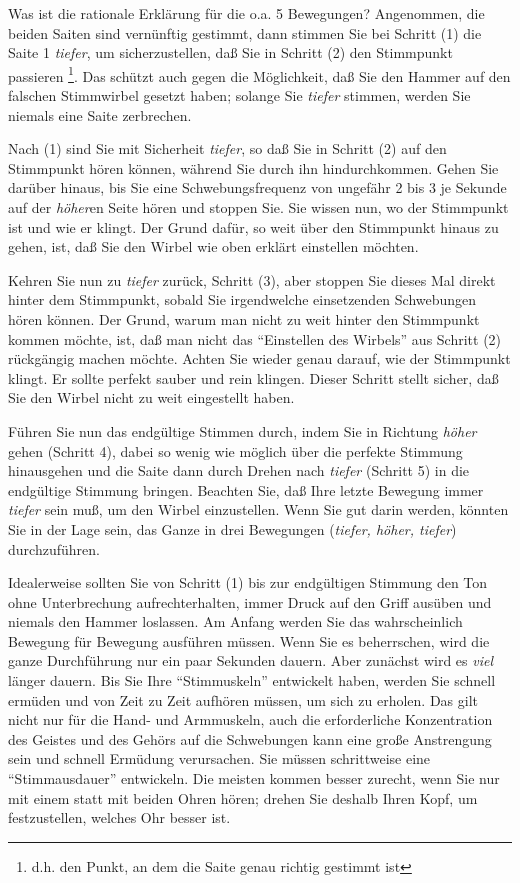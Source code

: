 Was ist die rationale Erklärung für die o.a. 5 Bewegungen?
 Angenommen, die beiden Saiten sind vernünftig gestimmt, dann stimmen Sie bei Schritt (1) die Saite 1 \textit{tiefer}, um sicherzustellen, daß Sie in Schritt (2) den Stimmpunkt passieren \footnote{d.h. den Punkt, an dem die Saite genau richtig gestimmt ist}.
 Das schützt auch gegen die Möglichkeit, daß Sie den Hammer auf den falschen Stimmwirbel gesetzt haben; solange Sie \textit{tiefer} stimmen, werden Sie niemals eine Saite zerbrechen.
 

Nach (1) sind Sie mit Sicherheit \textit{tiefer}, so daß Sie in Schritt (2) auf den Stimmpunkt hören können, während Sie durch ihn hindurchkommen.
 Gehen Sie darüber hinaus, bis Sie eine Schwebungsfrequenz von ungefähr 2 bis 3 je Sekunde auf der \textit{höher}en Seite hören und stoppen Sie.
 Sie wissen nun, wo der Stimmpunkt ist und wie er klingt.
 Der Grund dafür, so weit über den Stimmpunkt hinaus zu gehen, ist, daß Sie den Wirbel wie oben erklärt einstellen möchten.
 

Kehren Sie nun zu \textit{tiefer} zurück, Schritt (3), aber stoppen Sie dieses Mal direkt hinter dem Stimmpunkt, sobald Sie irgendwelche einsetzenden Schwebungen hören können.
 Der Grund, warum man nicht zu weit hinter den Stimmpunkt kommen möchte, ist, daß man nicht das \enquote{Einstellen des Wirbels} aus Schritt (2) rückgängig machen möchte.
 Achten Sie wieder genau darauf, wie der Stimmpunkt klingt.
 Er sollte perfekt sauber und rein klingen.
 Dieser Schritt stellt sicher, daß Sie den Wirbel nicht zu weit eingestellt haben.
 

Führen Sie nun das endgültige Stimmen durch, indem Sie in Richtung \textit{höher} gehen (Schritt 4), dabei so wenig wie möglich über die perfekte Stimmung hinausgehen und die Saite dann durch Drehen nach \textit{tiefer} (Schritt 5) in die endgültige Stimmung bringen.
 Beachten Sie, daß Ihre letzte Bewegung immer \textit{tiefer} sein muß, um den Wirbel einzustellen.
 Wenn Sie gut darin werden, könnten Sie in der Lage sein, das Ganze in drei Bewegungen (\textit{tiefer, höher, tiefer}) durchzuführen.
 

Idealerweise sollten Sie von Schritt (1) bis zur endgültigen Stimmung den Ton ohne Unterbrechung aufrechterhalten, immer Druck auf den Griff ausüben und niemals den Hammer loslassen.
 Am Anfang werden Sie das wahrscheinlich Bewegung für Bewegung ausführen müssen.
 Wenn Sie es beherrschen, wird die ganze Durchführung nur ein paar Sekunden dauern.
 Aber zunächst wird es \textit{viel} länger dauern.
 Bis Sie Ihre \enquote{Stimmuskeln} entwickelt haben, werden Sie schnell ermüden und von Zeit zu Zeit aufhören müssen, um sich zu erholen.
 Das gilt nicht nur für die Hand- und Armmuskeln, auch die erforderliche Konzentration des Geistes und des Gehörs auf die Schwebungen kann eine große Anstrengung sein und schnell Ermüdung verursachen.
 Sie müssen schrittweise eine \enquote{Stimmausdauer} entwickeln.
 Die meisten kommen besser zurecht, wenn Sie nur mit einem statt mit beiden Ohren hören; drehen Sie deshalb Ihren Kopf, um festzustellen, welches Ohr besser ist.
 

